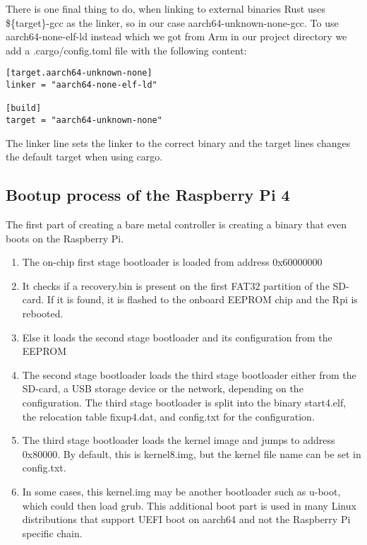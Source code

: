 There is one final thing to do, when linking to external binaries Rust uses \$\{target\}-gcc as the linker, so in our case aarch64-unknown-none-gcc.
To use aarch64-none-elf-ld instead which we got from Arm in our project directory we add a .cargo/config.toml file with the following content:
\begin{lstlisting}
[target.aarch64-unknown-none]
linker = "aarch64-none-elf-ld"

[build]
target = "aarch64-unknown-none"
\end{lstlisting}
The linker line sets the linker to the correct binary and the target lines changes the default target when using cargo.

\subsection{Bootup process of the Raspberry Pi 4}
\label{sec:concept_and_implementation:bare-metal:boot}

The first part of creating a bare metal controller is creating a binary that even boots on the Raspberry Pi.
\begin{enumerate}
    \item The on-chip first stage bootloader is loaded from address 0x60000000
    \item It checks if a recovery.bin is present on the first FAT32 partition of the SD-card. If it is found, it is flashed to the onboard EEPROM chip and the Rpi is rebooted.
    \item Else it loads the second stage bootloader and its configuration from the EEPROM
    \item The second stage bootloader loads the third stage bootloader either from the SD-card, a USB storage device or the network, depending on the configuration.
          The third stage bootloader is split into the binary start4.elf, the relocation table fixup4.dat, and config.txt for the configuration.
    \item The third stage bootloader loads the kernel image and jumps to address 0x80000. By default, this is kernel8.img, but the kernel file name can be set in config.txt.
    \item In some cases, this kernel.img may be another bootloader such as u-boot, which could then load grub.
          This additional boot part is used in many Linux distributions that support UEFI boot on aarch64 and not the Raspberry Pi specific chain.
\end{enumerate}

